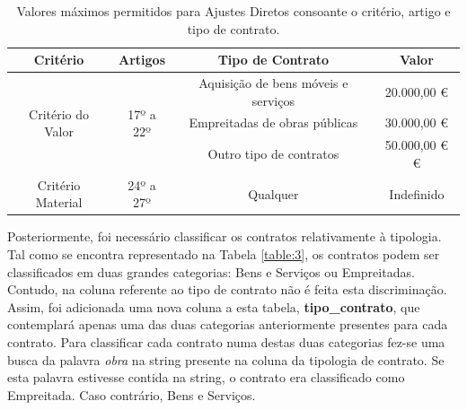 
 \begin{table}[H]
 	\centering
 	\begin{tabular}{|c|c|c|c|}
 		\hline
 		\textbf{Critério}                  & \textbf{Artigos}           & \textbf{Tipo de Contrato}           & \textbf{Valor} \\ \hline
 		\multirow{3}{*}{Critério do Valor} & \multirow{3}{*}{17º a 22º} & Aquisição de bens móveis e serviços & 20.000,00 €         \\ \cline{3-4} 
 		&                            & Empreitadas de obras públicas       & 30.000,00 €        \\ \cline{3-4} 
 		&                            & Outro tipo de contratos             & 50.000,00 € €        \\ \hline
 		Critério Material                  & 24º a 27º                  & Qualquer                            & Indefinido     \\ \hline
 	\end{tabular}
 	\caption{Valores máximos permitidos para Ajustes Diretos consoante o critério, artigo e tipo de contrato.}
 \end{table}

Posteriormente, foi necessário classificar os contratos relativamente à tipologia. Tal como se encontra representado na Tabela \ref{table:3}, os contratos podem ser classificados em duas grandes categorias: Bens e Serviços ou Empreitadas. Contudo, na coluna referente ao tipo de contrato não é feita esta discriminação. Assim, foi adicionada uma nova coluna a esta tabela, \textbf{tipo\_contrato}, que contemplará apenas uma das duas categorias anteriormente presentes para cada contrato. Para classificar cada contrato numa destas duas categorias fez-se uma busca da palavra \textit{obra} na string presente na coluna da tipologia de contrato. Se esta palavra estivesse contida na string, o contrato era classificado como Empreitada. Caso contrário, Bens e Serviços. 

